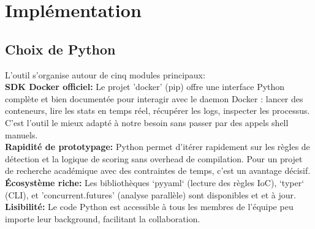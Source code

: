 \section{Implémentation}
\subsection{Choix de Python}
L'outil s'organise autour de cinq modules principaux: \\

\textbf{SDK Docker officiel:}
Le projet 'docker' (pip) offre une interface Python complète et bien documentée pour interagir avec le daemon Docker : lancer des conteneurs, lire les stats en temps réel, récupérer les logs, inspecter les processus. C'est l'outil le mieux adapté à notre besoin sans passer par des appels shell manuels. \\

\textbf{Rapidité de prototypage:}
Python permet d'itérer rapidement sur les règles de détection et la logique de scoring sans overhead de compilation. Pour un projet de recherche académique avec des contraintes de temps, c'est un avantage décisif. \\

\textbf{Écosystème riche:}
Les bibliothèques `pyyaml` (lecture des règles IoC), `typer` (CLI), et 'concurrent.futures' (analyse parallèle) sont disponibles et et à jour. \\

\textbf{Lisibilité:}
Le code Python est accessible à tous les membres de l'équipe peu importe leur background, facilitant la collaboration. \\
